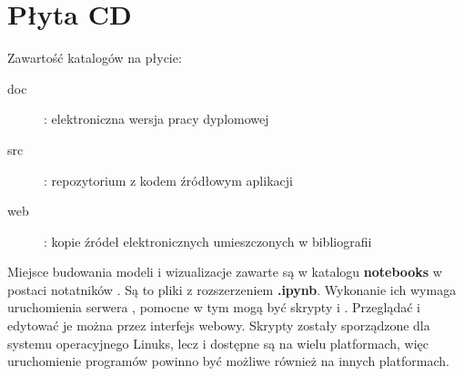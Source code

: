 \chapter{Płyta CD}\label{app:plyta}

\begin{figure}[htb]
\makebox[\textwidth]{\framebox[12.8cm]{\rule{0pt}{12.8cm}}}
\end{figure}
\pagebreak

Zawartość katalogów na płycie:
\begin{description}
    \item[doc] : elektroniczna wersja pracy dyplomowej
    \item[src] : repozytorium z kodem źródłowym aplikacji
    \item[web] : kopie źródeł elektronicznych umieszczonych w bibliografii
\end{description}

Miejsce budowania modeli i wizualizacje zawarte są w katalogu \textbf{notebooks} w postaci notatników . Są to pliki z rozszerzeniem \textbf{.ipynb}. Wykonanie ich wymaga uruchomienia serwera , pomocne w tym mogą być skrypty  i . Przeglądać i edytować je można przez interfejs webowy. Skrypty zostały sporządzone dla systemu operacyjnego Linuks, lecz  i  dostępne są na wielu platformach, więc uruchomienie programów powinno być możliwe również na innych platformach.

